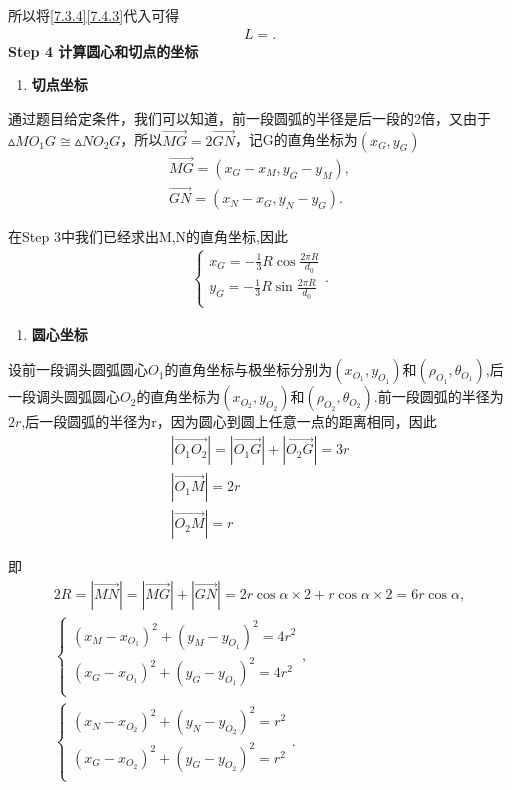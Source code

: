 \documentclass[../main.tex]{subfiles}
\begin{document}
\par 所以将\eqref{7.3.4}\eqref{7.4.3}代入可得
\begin{align}\label{1.........46}
L=.
\end{align}
\noindent\textbf{Step 4 计算圆心和切点的坐标}     
\begin{enumerate}
\item \textbf{切点坐标}
\end{enumerate} 
\par 通过题目给定条件，我们可以知道，前一段圆弧的半径是后一段的2倍，又由于$\vartriangle MO_1G\cong \vartriangle NO_2G$，所以$\vec{MG}=2\vec{GN}$，记G的直角坐标为$(x_{G},y_{G})$
\begin{gather}\label{1.........47}
\overrightarrow{MG}=\left( x_G-x_M,y_G-y_M \right) ,
\\
\overrightarrow{GN}=\left( x_N-x_G,y_N-y_G \right) .
\end{gather}
\par 在Step 3中我们已经求出M,N的直角坐标,因此
\begin{align}\label{1.........48}
\begin{cases}
x_G= -\frac{1}{3}R\cos\frac{2\pi R}{d_0}\\
y_G=-\frac{1}{3}R\sin\frac{2\pi R}{d_0}\\
\end{cases}.
\end{align}
\begin{enumerate}[start=2]
\item \textbf{圆心坐标}
\end{enumerate}   
\par 设前一段调头圆弧圆心$O_1$的直角坐标与极坐标分别为$(x_{O_1},y_{O_1})$和$(\rho_{O_1},\theta_{O_1})$,后一段调头圆弧圆心$O_2$的直角坐标为$(x_{O_2},y_{O_2})$和$(\rho_{O_2},\theta_{O_2})$.前一段圆弧的半径为$2r$,后一段圆弧的半径为r，因为圆心到圆上任意一点的距离相同，因此
\begin{gather}\label{1.........49}
|\overrightarrow{O_1O_2}|= |\overrightarrow{O_1G}| + |\overrightarrow{O_2G}| = 3r\\
|\overrightarrow{O_1M}|=2r   \\
|\overrightarrow{O_2M}|=r
\end{gather}
\par 即
\begin{gather}
2R=\left| \overrightarrow{MN} \right|=\left| \overrightarrow{MG} \right|+\left| \overrightarrow{GN} \right|= 2r\cos\alpha\times2 + r\cos\alpha\times2 = 6r\cos\alpha,
\\
\begin{cases}\label{1.........50}
\left( x_M-x_{O_1} \right) ^2+\left( y_M-y_{O_1} \right) ^2=4r^2\\
\left( x_G-x_{O_1} \right) ^2+\left( y_G-y_{O_1} \right) ^2=4r^2\\
\end{cases},
\\
\begin{cases}\label{1.........51}
\left( x_N-x_{O_2} \right) ^2+\left( y_N-y_{O_2} \right) ^2=r^2\\
\left( x_G-x_{O_2} \right) ^2+\left( y_G-y_{O_2} \right) ^2=r^2\\
\end{cases}.
\end{gather}
\end{document}
